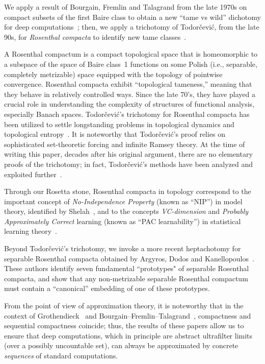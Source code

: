 We apply a result of Bourgain, Fremlin and Talagrand from the late 1970s on compact subsets of the first Baire class to obtain a new ``tame vs wild'' dichotomy for deep computations~\cite{BFT_1978_PCompactBaire}; then, we apply a trichotomy of Todorčević, from the late 90s, for \emph{Rosenthal compacta} to identify new tame classes~\cite{Todorcevic_1999_CompactSubsetsBaire}.

A Rosenthal compactum is a compact topological space that is homeomorphic to a subspace of the space of Baire class~1 functions on some Polish (i.e., separable, completely metrizable) space equipped with the topology of pointwise convergence.
Rosenthal compacta exhibit ``topological tameness,'' meaning that they behave in relatively controlled ways.
Since the late 70's, they have played a crucial role in understanding the complexity of structures of functional analysis, especially Banach spaces.
Todorčević's trichotomy for Rosenthal compacta has been utilized to settle longstanding problems in topological dynamics and topological entropy~\cite{glasner2022tame}.
It is noteworthy that Todorčević's proof relies on sophisticated set-theoretic forcing and infinite Ramsey theory.
At the time of writing this paper, decades after his original argument, there are no elementary proofs of the trichotomy; in fact, Todorčević's methods have been analyzed and exploited further~\cite{Todorcevic:2023,horowitz2019compactsetsbaireclass}.

Through our Rosetta stone, Rosenthal compacta in topology correspond to the important concept of \emph{No-Independence Property} (known as ``NIP'') in model theory, identified by Shelah~\cite{Shelah:1971,Shelah:1990}, and to the concepts \emph{VC-dimension} and \emph{Probably Approximately Correct} learning (known as ``PAC learnability'') in statistical learning theory~\cite{Vapnik-Chervonenkis:1971, Vapnik-Chervonenkis:1974, Valiant:1984}.

Beyond Todorčević's trichotomy, we invoke a more recent heptachotomy for separable Rosenthal compacta obtained by Argyros, Dodos and Kanellopoulos~\cite{argyros2008rosenthal}.
These authors identify seven fundamental ``prototypes" of separable Rosenthal compacta, and show that any non-metrizable separable Rosenthal compactum must contain a ``canonical'' embedding of one of these prototypes.

From the point of view of approximation theory, it is noteworthy that in the context of Gro\-then\-dieck~\cite{Grothendieck:1952} and Bourgain--Fremlin--Talagrand~\cite{BFT_1978_PCompactBaire}, compactness and sequential compactness coincide; thus, the results of these papers allow us to ensure that deep computations, which in principle are abstract ultrafilter limits (over a possibly uncountable set), can always be approximated by concrete \emph{sequences} of standard computations.

